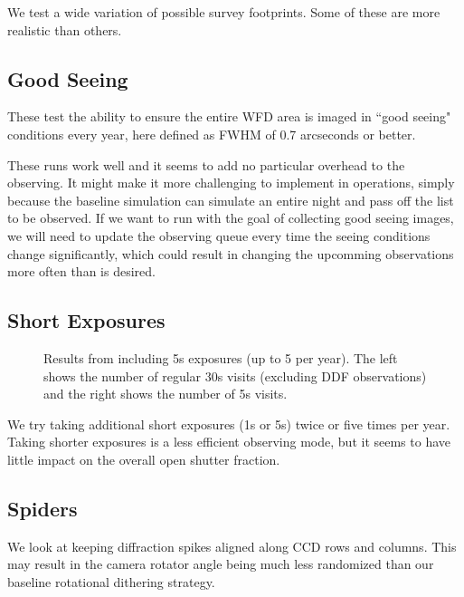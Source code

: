 We test a wide variation of possible survey footprints. Some of these are more realistic than others. 



\subsection{Good Seeing}\label{ss:goodseeing}

These test the ability to ensure the entire WFD area is imaged in ``good seeing" conditions every year, here defined as FWHM of 0.7 arcseconds or better.  

These runs work well and it seems to add no particular overhead to the observing. It might make it more challenging to implement in operations, simply because the baseline simulation can simulate an entire night and pass off the list to be observed. If we want to run with the goal of collecting good seeing images, we will need to update the observing queue every time the seeing conditions change significantly, which could result in changing the upcomming observations more often than is desired.

\subsection{Short Exposures}

\begin{figure}
\caption{Results from including 5s exposures (up to 5 per year). The left shows the number of regular 30s visits (excluding DDF observations) and the right shows the number of 5s visits.}
\end{figure}

We try taking additional short exposures (1s or 5s) twice or five times per year. Taking shorter exposures is a less efficient observing mode, but it seems to have little impact on the overall open shutter fraction.

\subsection{Spiders}

We look at keeping diffraction spikes aligned along CCD rows and columns. This may result in the camera rotator angle being much less randomized than our baseline rotational dithering strategy.

